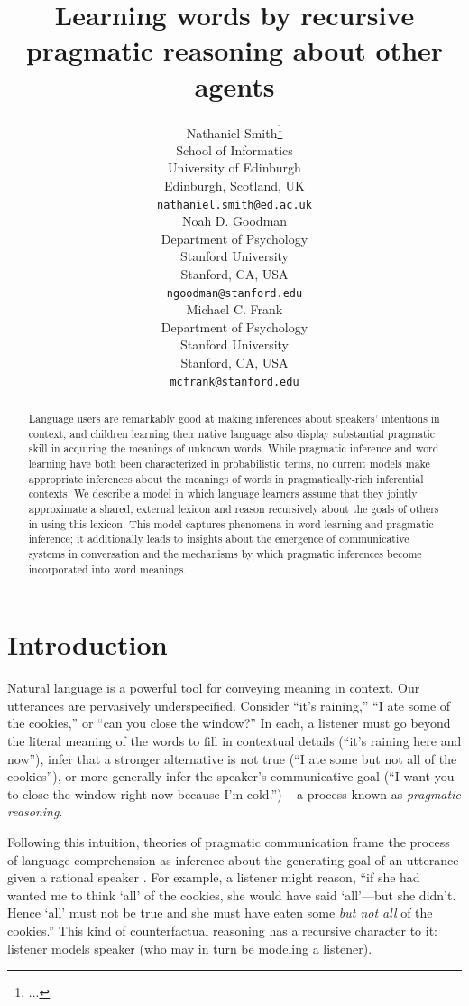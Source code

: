 \documentclass{article} %
\title{Learning words by recursive pragmatic reasoning about other agents}
\author{
Nathaniel Smith\thanks{...} \\
School of Informatics\\
University of Edinburgh\\
Edinburgh, Scotland, UK\\
\texttt{nathaniel.smith@ed.ac.uk} \\
\AND
Noah D. Goodman \\
Department of Psychology\\
Stanford University \\
Stanford, CA, USA \\
\texttt{ngoodman@stanford.edu} \\
\And
Michael C. Frank \\
Department of Psychology \\
Stanford University \\
Stanford, CA, USA \\
\texttt{mcfrank@stanford.edu}}
\begin{document}
\maketitle

\begin{abstract}
Language users are remarkably good at making inferences about speakers' intentions in context, and children learning their native language also display substantial pragmatic skill in acquiring the meanings of unknown words. While pragmatic inference and word learning have both been characterized in probabilistic terms, no current models make appropriate inferences about the meanings of words in pragmatically-rich inferential contexts. We describe a model in which language learners assume that they jointly approximate a shared, external lexicon and reason recursively about the goals of others in using this lexicon. This model captures phenomena in word learning and pragmatic inference; it additionally leads to insights about the emergence of communicative systems in conversation and the mechanisms by which pragmatic inferences become incorporated into word meanings.
\end{abstract}

\section{Introduction}

Natural language is a powerful tool for conveying meaning in context. Our utterances are pervasively underspecified. Consider ``it's raining,'' ``I ate some of the cookies,'' or ``can you close the window?'' In each, a listener must go beyond the literal meaning of the words to fill in contextual details (``it's raining here and now''), infer that a stronger alternative is not true (``I ate some but not all of the cookies''), or more generally infer the speaker's communicative goal (``I want you to close the window right now because I'm cold.'') -- a process known as \textit{pragmatic reasoning}.

Following this intuition, theories of pragmatic communication frame the process of language comprehension as inference about the generating goal of an utterance given a rational speaker \cite{grice1975,dale1995,frank2012}. For example, a listener might reason, ``if she had wanted me to think `all' of the cookies, she would have said `all'---but she didn't. Hence `all' must not be true and she must have eaten some {\it but not all} of the cookies.'' This kind of counterfactual reasoning has a recursive character to it: listener models speaker (who may in turn be modeling a listener).
\end{document}

